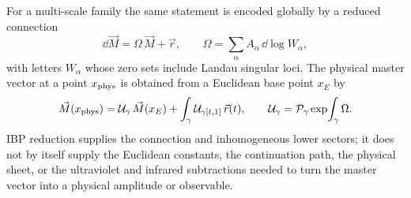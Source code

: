 \begin{construction}
For a multi-scale family the same statement is encoded globally by a reduced
connection
\[
  \dd\vec M=\Omega\,\vec M+\vec r,
  \qquad
  \Omega=\sum_\alpha A_\alpha\,\dd\log W_\alpha ,
\]
with letters \(W_\alpha\) whose zero sets include Landau singular loci.  The
physical master vector at a point \(x_{\rm phys}\) is obtained from a Euclidean
base point \(x_E\) by
\[
  \vec M(x_{\rm phys})
  =
  \mathcal U_\gamma\,\vec M(x_E)
  +
  \int_\gamma
    \mathcal U_{\gamma[t,1]}\,\vec r(t),
  \qquad
  \mathcal U_\gamma=
  \mathcal P_\gamma\exp\!\int_\gamma\Omega .
\]
IBP reduction supplies the connection and inhomogeneous lower sectors; it
does not by itself supply the Euclidean constants, the continuation path, the
physical sheet, or the ultraviolet and infrared subtractions needed to turn
the master vector into a physical amplitude or observable.
\end{construction}

